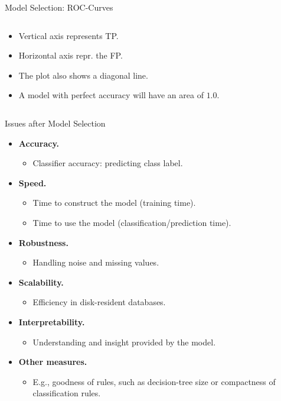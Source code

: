 \begin{frame}{Model Selection: ROC-Curves}
\begin{columns}
\begin{column}{0.4\textwidth}
      \begin{itemize}
      \item Vertical axis represents TP.
      \item Horizontal axis repr. the FP.
      \item The plot also shows a diagonal line.
      \item A model with perfect accuracy will have an area of $1.0$.
      \end{itemize}
    \end{column}
  \end{columns}
\end{frame}

\begin{frame}{Issues after Model Selection}
  \begin{itemize}
  \item \textbf{Accuracy.}
    \begin{itemize}
    \item Classifier accuracy: predicting class label.
    \end{itemize}
  \item \textbf{Speed.}
    \begin{itemize}
    \item Time to construct the model (training time).
    \item Time to use the model (classification/prediction time).
    \end{itemize}
  \item \textbf{Robustness.}
    \begin{itemize}
    \item Handling noise and missing values.
    \end{itemize}
  \item \textbf{Scalability.}
    \begin{itemize}
    \item Efficiency in disk-resident databases.
    \end{itemize}
  \item \textbf{Interpretability.}
    \begin{itemize}
    \item Understanding and insight provided by the model.
    \end{itemize}
  \item \textbf{Other measures.}
    \begin{itemize}
    \item E.g., goodness of rules, such as decision-tree size or compactness of classification rules.
    \end{itemize}
  \end{itemize}
\end{frame}
